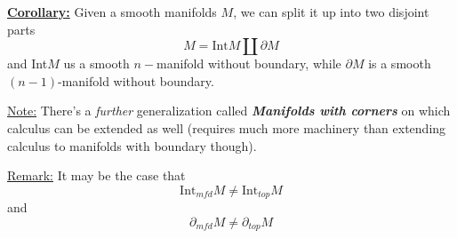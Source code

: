 \documentclass{article}
\begin{document}
\vskip 1cm
\begin{dottedbox}

\underline{\textbf{Corollary:}}
Given a smooth manifolds $M$, we can split it up into two disjoint parts
\[ M = \text{Int}M \coprod \partial M \]
and Int$M$ us a smooth $n-$manifold without boundary, while $\partial M$ is a smooth $(n-1)$-manifold without boundary.

\end{dottedbox}

\vskip 0.5cm
\underline{Note:} There's a \emph{further} generalization called \textbf{\emph{Manifolds with corners}} on which calculus can be extended as well (requires much more machinery than extending calculus to manifolds with boundary though).

\vskip 0.5cm
\underline{Remark:} It may be the case that 
\[ \text{Int}_{mfd}M \neq \text{Int}_{top}M \]
and
\[ \partial_{mfd}M \neq \partial_{top}M \]
\end{document}
